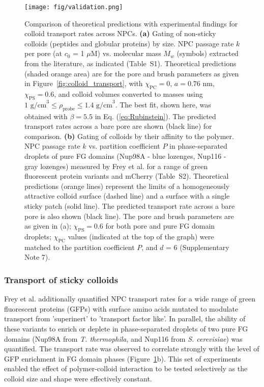 \documentclass[12pt, a4paper]{article}
\begin{document}
\begin{figure}
    \centering
    \centerline{\texttt{[image: fig/validation.png]}}
    \caption{
    Comparison of theoretical predictions with experimental findings for colloid transport rates across NPCs.
    \textbf{(a)} 
    Gating of non-sticky colloids (peptides and globular proteins) by size.
    NPC passage rate $k$ per pore (at $c_0$ = 1 $\mu\text{M}$) vs. molecular mass $M_w$ (symbols) extracted from the literature, as indicated (Table~S1).
    Theoretical predictions (shaded orange area) are for the pore and brush parameters as given in Figure~\ref{fig:colloid_transport}, with $\chi_\text{PC} = 0$, $a = 0.76$ nm, $\chi_\text{PS} = 0.6$, and colloid volumes converted to masses using $\text{1 g/cm}^3 \leq \rho_\text{probe} \leq \text{1.4 g/cm}^3$.
    The best fit, shown here, was obtained with $\beta = 5.5$ in Eq. (\ref{eq:Rubinstein}).
    The predicted transport rates across a bare pore are shown (black line) for comparison.
    \textbf{(b)} 
    Gating of colloids by their affinity to the polymer.
    NPC passage rate $k$ vs. partition coefficient $P$ in phase-separated droplets of pure FG domains (Nup98A - blue lozenges, Nup116 - gray lozenges) measured by Frey et al. \cite{Frey2018} for a range of green fluorescent protein variants and mCherry (Table~S2).
    Theoretical predictions (orange lines) represent the limits of a homogeneously attractive colloid surface (dashed line) and a surface with a single sticky patch (solid line).
    The predicted transport rate across a bare pore is also shown (black line).
    The pore and brush parameters are as given in (a); $\chi_\text{PS} = 0.6$ for both pore and pure FG domain droplets; $\chi_\text{PC}$ values (indicated at the top of the graph) were matched to the partition coefficient $P$, and $d$ = 6 (Supplementary Note 7).
    }
    \label{fig:NPC_comparison}
\end{figure}


\subsubsection{Transport of sticky colloids}

Frey et al. \cite{Frey2018} additionally quantified NPC transport rates for a wide range of green fluorescent proteins (GFPs) with surface amino acids mutated to modulate transport from 'superinert' to 'transport factor like'.
In parallel, the ability of these variants to enrich or deplete in phase-separated droplets of two pure FG domains (Nup98A from \textit{T. thermophila}, and Nup116 from \textit{S. cerevisiae}) was quantified.
The transport rate was observed to correlate strongly with the level of GFP enrichment in FG domain phases (Figure~\ref{fig:NPC_comparison}b).
This set of experiments enabled the effect of polymer-colloid interaction to be tested selectively as the colloid size and shape were effectively constant.
\end{document}
